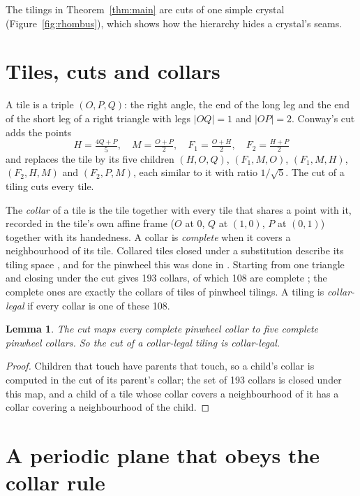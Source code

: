 \documentclass[11pt]{article}
\newtheorem{lemma}[theorem]{Lemma}
\theoremstyle{definition}
\theoremstyle{remark}
\begin{document}
The tilings in Theorem~\ref{thm:main} are cuts of one simple crystal
(Figure~\ref{fig:rhombus}), which shows how the hierarchy hides a crystal's
seams.

\section{Tiles, cuts and collars}

A tile is a triple $(O,P,Q)$: the right angle, the end of the long leg and the
end of the short leg of a right triangle with legs $|OQ|=1$ and $|OP|=2$.
Conway's cut adds the points
\[
H=\tfrac{4Q+P}{5},\quad M=\tfrac{O+P}{2},\quad F_1=\tfrac{O+H}{2},\quad F_2=\tfrac{H+P}{2}
\]
and replaces the tile by its five children
$(H,O,Q)$, $(F_1,M,O)$, $(F_1,M,H)$, $(F_2,H,M)$ and $(F_2,P,M)$, each similar
to it with ratio $1/\sqrt5$. The cut of a tiling cuts every tile.

The \emph{collar} of a tile is the tile together with every tile that shares a
point with it, recorded in the tile's own affine frame ($O$ at $0$, $Q$ at
$(1,0)$, $P$ at $(0,1)$) together with its handedness. A collar is
\emph{complete} when it covers a neighbourhood of its tile. Collared tiles
closed under a substitution describe its tiling space \cite{AP98}, and for the
pinwheel this was done in \cite{BDHS10,FWW14}. Starting from one triangle and
closing under the cut gives 193 collars, of which 108 are complete
\cite{CP-atlas}; the complete ones are exactly the collars of tiles of pinwheel
tilings. A tiling is \emph{collar-legal} if every collar is
one of these 108.

\begin{lemma}\label{lem:cut}
The cut maps every complete pinwheel collar to five complete pinwheel collars.
So the cut of a collar-legal tiling is collar-legal.
\end{lemma}

\begin{proof}
Children that touch have parents that touch, so a child's collar is computed in
the cut of its parent's collar; the set of 193 collars is closed under this map,
and a child of a tile whose collar covers a neighbourhood of it has a collar
covering a neighbourhood of the child.
\end{proof}

\section{A periodic plane that obeys the collar rule}
\end{document}
